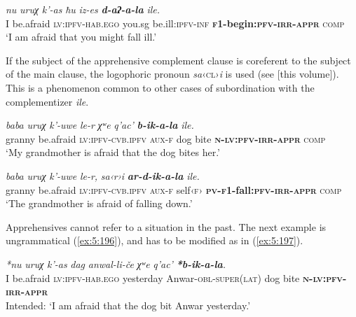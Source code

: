 ﻿\documentclass[output=paper]{langsci/langscibook}
\begin{document}
\ex %
\gll \emph{nu} \emph{uruχ} \emph{k'-as} \emph{ħu} \emph{iz-es} \emph{\textbf{d-aʔ-a-la}} \emph{ile.}\\
 I be.afraid \textsc{lv}:\textsc{ipfv}-\textsc{hab}.\textsc{ego} you.sg be.ill:\textsc{ipfv}-\textsc{inf} \textbf{\textsc{f1}-begin:\textsc{pfv}-\textsc{irr}-\textsc{appr}} \textsc{comp}\\
\glt `I am afraid that you might fall ill.'
\z

If the subject of the apprehensive complement clause is coreferent to
the subject of the main clause, the logophoric pronoun \emph{sa}‹\textsc{cl}›\emph{i} is
used (see \citealt{kozhukhar2019} [this volume]). This is a phenomenon common to other
cases of subordination with the complementizer \emph{ile}.

\ea %
\gll \emph{baba} \emph{uruχ} \emph{k'-uwe} \emph{le-r} \emph{χʷe} \emph{q'ac'} \emph{\textbf{b-ik-a-la}} \emph{ile.}\\
 granny be.afraid \textsc{lv}:\textsc{ipfv}-\textsc{cvb.ipfv} \textsc{aux}-\textsc{f} dog  bite \textbf{\textsc{n}-\textsc{lv}:\textsc{pfv}-\textsc{irr}-\textsc{appr}} \textsc{comp} \\
\glt `My grandmother is afraid that the dog bites her.'

\ex %
\gll \emph{baba} \emph{uruχ} \emph{k'-uwe} \emph{le-r,} \emph{sa‹r›i} \emph{\textbf{ar-d-ik-a-la}} \emph{ile.}\\
 granny be.afraid \textsc{lv}:\textsc{ipfv}-\textsc{cvb.ipfv} \textsc{aux}-\textsc{f} self‹\textsc{f}› \textbf{\textsc{pv}-\textsc{f1}-fall:\textsc{pfv}-\textsc{irr}-\textsc{appr}} \textsc{comp}\\
\glt `The grandmother is afraid of falling down.'
\z

Apprehensives cannot refer to a situation in the past. The next example
is ungrammatical (\ref{ex:5:196}), and has to be modified as in (\ref{ex:5:197}).

\pagebreak

\ea \label{ex:5:196} %
\gll \emph{*nu} \emph{uruχ} \emph{k'-as} \emph{dag} \emph{anwal-li-če} \emph{χʷe} \emph{q'ac'} \emph{\textbf{*b-ik-a-la}.}\\
 I be.afraid \textsc{lv}:\textsc{ipfv}-\textsc{hab}.\textsc{ego} yesterday Anwar-\textsc{obl}-\textsc{super}(\textsc{lat}) dog bite \textbf{\textsc{n}-\textsc{lv}:\textsc{pfv}-\textsc{irr}-\textsc{appr}} \\
\glt 
Intended: `I am afraid that the dog bit Anwar yesterday.'
\end{document}
